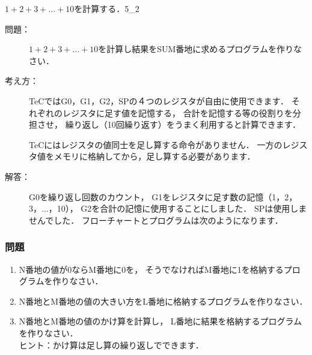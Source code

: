 \newpage
\begin{reidai}{$1 + 2 + 3 + ... + 10$を計算する．}{5_2}
\begin{description}
\item[問題：]
$1 + 2 + 3 + ... + 10$を計算し結果をSUM番地に求めるプログラムを作りなさい．

\item[考え方：]
TeCではG0，G1，G2，SPの４つのレジスタが自由に使用できます．
それぞれのレジスタに足す値を記憶する，
合計を記憶する等の役割りを分担させ，
繰り返し（10回繰り返す）をうまく利用すると計算できます．

TeCにはレジスタの値同士を足し算する命令がありません．
一方のレジスタ値をメモリに格納してから，足し算する必要があります．

\item[解答：]
G0を繰り返し回数のカウント，
G1をレジスタに足す数の記憶（1，2，3，...，10），
G2を合計の記憶に使用することにしました．
SPは使用しませんでした．
フローチャートとプログラムは次のようになります．

\begin{center}
\end{center}
\end{description}
\end{reidai}

\vfill
\subsubsection{問題}
\begin{enumerate}
\item N番地の値が0ならM番地に0を，
そうでなければM番地に1を格納するプログラムを作りなさい．
\item N番地とM番地の値の大きい方をL番地に格納するプログラムを作りなさい．
\item N番地とM番地の値のかけ算を計算し，
L番地に結果を格納するプログラムを作りなさい．\\
ヒント：かけ算は足し算の繰り返しでできます．
\end{enumerate}
\vfill

